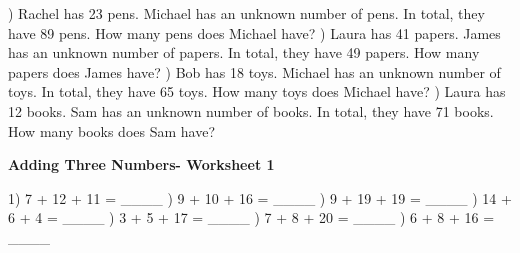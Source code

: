 \documentclass{article}%
\begin{document}
) Rachel has 23 pens. Michael has an unknown number of pens. In total, they have 89 pens. How many pens does Michael have?%
\newline%
\newline%
) Laura has 41 papers. James has an unknown number of papers. In total, they have 49 papers. How many papers does James have?%
\newline%
\newline%
) Bob has 18 toys. Michael has an unknown number of toys. In total, they have 65 toys. How many toys does Michael have?%
\newline%
\newline%
) Laura has 12 books. Sam has an unknown number of books. In total, they have 71 books. How many books does Sam have?%
\newline%
\newline%
\newline%
\pagebreak%
\large%
\begin{center}%
\textbf{Adding Three Numbers- Worksheet 1}%
\newline%
\end{center} \normalsize%
1) 7 + 12 + 11 = \_\_\_\_%
\newline%
\newline%
) 9 + 10 + 16 = \_\_\_\_%
\newline%
\newline%
) 9 + 19 + 19 = \_\_\_\_%
\newline%
\newline%
) 14 + 6 + 4 = \_\_\_\_%
\newline%
\newline%
) 3 + 5 + 17 = \_\_\_\_%
\newline%
\newline%
) 7 + 8 + 20 = \_\_\_\_%
\newline%
\newline%
) 6 + 8 + 16 = \_\_\_\_%
\newline%
\newline%
\newline%
\end{document}
